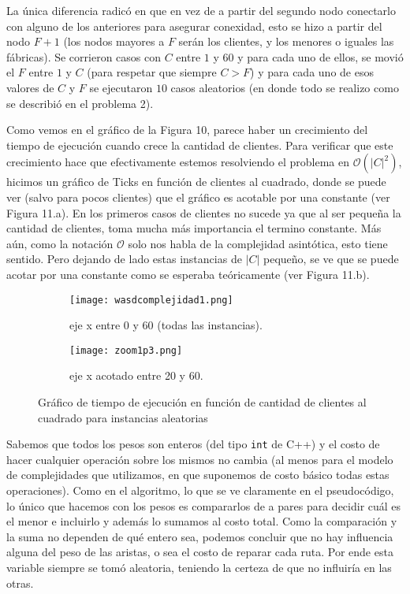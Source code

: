\documentclass[A4paper,oneside,fleqn,11pt]{article}
\theoremstyle{definition}
\begin{document}
 La única diferencia radicó en que en vez de a partir del segundo nodo conectarlo con alguno de los anteriores para asegurar conexidad, esto se hizo a partir del nodo $F+1$ (los nodos mayores a $F$ serán los clientes, y los menores o iguales las fábricas). Se corrieron casos con $C$ entre $1$ y $60$ y para cada uno de ellos, se movió el $F$ entre $1$ y $C$ (para respetar que siempre $C>F$) y para cada uno de esos valores de $C$ y $F$ se ejecutaron $10$ casos aleatorios (en donde todo se realizo como se describió en el problema 2).

Como vemos en el gráfico de la Figura 10, parece haber un crecimiento del tiempo de ejecución cuando crece la cantidad de clientes. Para verificar que este crecimiento hace que efectivamente estemos resolviendo el problema en $\mathcal{O}(|C|^2)$, hicimos un gr\'afico de Ticks en función de clientes al cuadrado, donde se puede ver (salvo para pocos clientes) que el gráfico es acotable por una constante (ver Figura 11.a). En los primeros casos de clientes no sucede ya que al ser pequeña la cantidad de clientes, toma mucha más importancia el termino constante. Más aún, como la notación $\mathcal{O}$ solo nos habla de la complejidad asintótica, esto tiene sentido. Pero dejando de lado estas instancias de $	|C|$ pequeño, se ve que se puede acotar por una constante como se esperaba teóricamente (ver Figura 11.b).


\begin{figure}[H] %
    \begin{subfigure}[b]{0.45\textwidth}
        \texttt{[image: wasdcomplejidad1.png]}
        \caption[center]{eje x entre 0 y 60 (todas las instancias).}
        \label{ni se pa que sirve esto}
    \end{subfigure}
    \begin{subfigure}[b]{0.45\textwidth}
        \texttt{[image: zoom1p3.png]}
        \caption{eje x acotado entre 20 y 60.}
        \label{ni se pa que sirve esto}
    \end{subfigure}
    \caption{Gráfico de tiempo de ejecución en función de cantidad de clientes al cuadrado para instancias aleatorias}
\end{figure}


\normalsize

Sabemos que todos los pesos son enteros (del tipo \texttt{int} de C++) y el costo de hacer cualquier operación sobre los mismos no cambia (al menos para el modelo de complejidades que utilizamos, en que suponemos de costo básico todas estas operaciones). Como en el algoritmo, lo que se ve claramente en el pseudocódigo, lo único que hacemos con los pesos es compararlos de a pares para decidir cu\'al es el menor e incluirlo y además lo sumamos al costo total. Como la comparación y la suma no dependen de qué entero sea, podemos concluir que no hay influencia alguna del peso de las aristas, o sea el costo de reparar cada ruta. Por ende esta variable siempre se tomó aleatoria, teniendo la certeza de que no influiría en las otras. 
\end{document}
